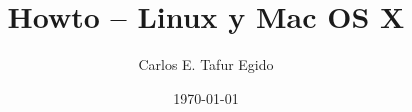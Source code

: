 










\title{Howto -- Linux y Mac OS X}
\author{Carlos E. Tafur Egido}
\date{\today}
\maketitle
\tableofcontents







\appendix





